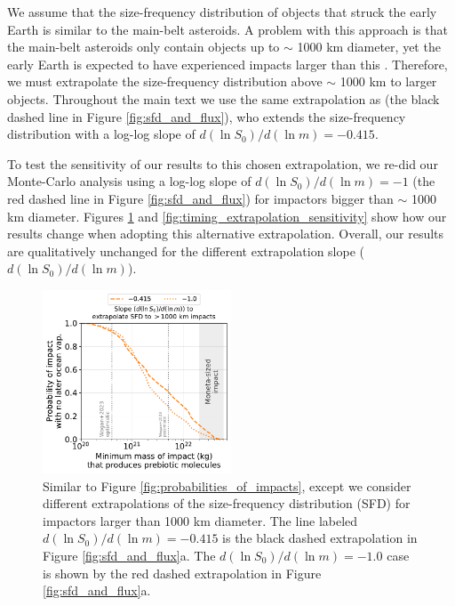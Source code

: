 \documentclass{aastex631}
\begin{document}
We assume that the size-frequency distribution of objects that struck the early Earth is similar to the main-belt asteroids. A problem with this approach is that the main-belt asteroids only contain objects up to $\sim$ 1000 km diameter, yet the early Earth is expected to have experienced impacts larger than this \citep{Marchi_2014}. Therefore, we must extrapolate the size-frequency distribution above $\sim$ 1000 km to larger objects. Throughout the main text we use the same extrapolation as \citet{Marchi_2014} (the black dashed line in Figure \ref{fig:sfd_and_flux}), who extends the size-frequency distribution with a log-log slope of $d (\ln S_0)/d (\ln m) = - 0.415$.

To test the sensitivity of our results to this chosen extrapolation, we re-did our Monte-Carlo analysis using a log-log slope of $d (\ln S_0)/d (\ln m) = - 1$ (the red dashed line in Figure \ref{fig:sfd_and_flux}) for impactors bigger than $\sim$ 1000 km diameter. Figures \ref{fig:probabilities_of_impacts_extrapolation_sens} and \ref{fig:timing_extrapolation_sensitivity} show how our results change when adopting this alternative extrapolation. Overall, our results are qualitatively unchanged for the different extrapolation slope ($d (\ln S_0)/d (\ln m)$).

\begin{figure}
  \centering
  \includegraphics[width=0.5\textwidth]{figures/probabilities_of_impacts_extrapolation_sens.pdf}
  \caption{Similar to Figure \ref{fig:probabilities_of_impacts}, except we consider different extrapolations of the size-frequency distribution (SFD) for impactors larger than 1000 km diameter. The line labeled $d (\ln S_0)/d (\ln m) = - 0.415$ is the black dashed extrapolation in Figure \ref{fig:sfd_and_flux}a. The $d (\ln S_0)/d (\ln m) = - 1.0$ case is shown by the red dashed extrapolation in Figure \ref{fig:sfd_and_flux}a.}
  \label{fig:probabilities_of_impacts_extrapolation_sens}
\end{figure}
\end{document}
